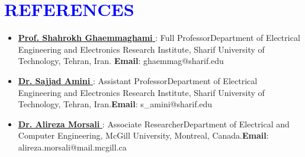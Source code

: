 \documentclass[letterpaper,11pt]{article}
\newcommand{\resumeSubHeadingListStart}{\begin{itemize}[leftmargin=0.0in, label={}]}
\begin{document}
	\section{\Large{\textcolor{blue}{REFERENCES}}}
	\begin{itemize}[itemsep=-2pt, parsep=5pt]
		\item \href{http://sharif.edu/~ghaemmag/}{\textbf{Prof. Shahrokh Ghaemmaghami} {\raisebox{-0.1\height}\faExternalLink }}: Full Professor\newline Department of Electrical Engineering and Electronics Research Institute, Sharif University of Technology, Tehran, Iran. \newline \textbf{Email}: ghaemmag@sharif.edu 
		
		\item \href{https://scholar.google.com/citations?user=24GngZYAAAAJ&hl=en}{\textbf{Dr. Sajjad Amini} {\raisebox{-0.1\height}\faExternalLink }}: Assistant Professor\newline Department of Electrical Engineering and Electronics Research Institute, Sharif University of Technology, Tehran, Iran.\newline \textbf{Email}: s\_amini@sharif.edu
		
		
		\item \href{https://scholar.google.com/citations?user=y-RVrUkAAAAJ&hl=en}{\textbf{Dr. Alireza Morsali} {\raisebox{-0.1\height}\faExternalLink }}: Associate Researcher\newline Department of Electrical and Computer Engineering, McGill University, Montreal, Canada.\newline \textbf{Email}:  alireza.morsali@mail.mcgill.ca
	\end{itemize}
	
	
	
	
	
\end{document}
